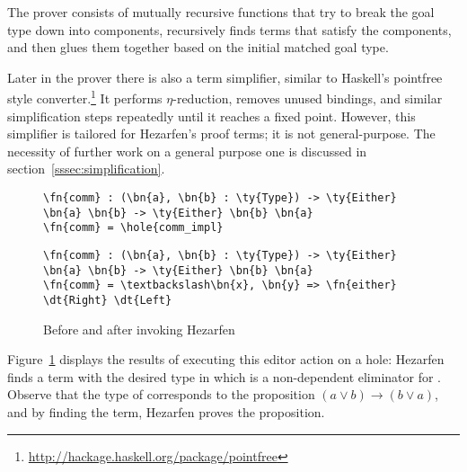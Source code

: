 The prover consists of mutually recursive functions that try to break
the goal type down into components, recursively finds terms that satisfy the
components, and then glues them together based on the initial matched goal
type.

Later in the prover there is also a term simplifier, similar to Haskell's
pointfree style
converter.\footnote{\url{http://hackage.haskell.org/package/pointfree}} It performs
\mbox{$\eta$-reduction}, removes unused  bindings, and similar
simplification steps repeatedly until it reaches a fixed point.
However, this simplifier is tailored for Hezarfen's proof terms; it is not
general-purpose.  The necessity of further work on a general purpose one is
discussed in section~\ref{sssec:simplification}.

\begin{figure}[h]
\begin{Verbatim}
\fn{comm} : (\bn{a}, \bn{b} : \ty{Type}) -> \ty{Either} \bn{a} \bn{b} -> \ty{Either} \bn{b} \bn{a}
\fn{comm} = \hole{comm_impl}
\end{Verbatim}
  \vspace{1em}
\begin{Verbatim}
\fn{comm} : (\bn{a}, \bn{b} : \ty{Type}) -> \ty{Either} \bn{a} \bn{b} -> \ty{Either} \bn{b} \bn{a}
\fn{comm} = \textbackslash\bn{x}, \bn{y} => \fn{either} \dt{Right} \dt{Left}
\end{Verbatim}
\caption{Before and after invoking Hezarfen}
  \label{fig:hezarfen-example}
\end{figure}

Figure~\ref{fig:hezarfen-example} displays the results of
executing this editor action on a hole:
Hezarfen finds a term with the desired type in which  is a non-dependent eliminator for .
Observe that the type of  corresponds to the proposition
$(a \lor b) \to (b \lor a)$, and by finding the term, Hezarfen proves
the proposition.

